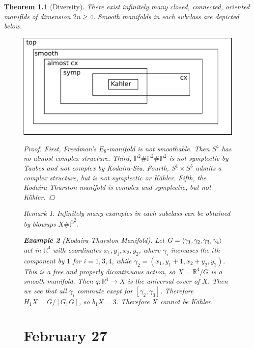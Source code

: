 \documentclass[leqno, openany]{memoir}
\DeclarePairedDelimiter{\gen}{\langle}{\rangle}
\newtheorem{thm}{Theorem}[chapter]
\theoremstyle{definition}
\newtheorem{exm}[thm]{Example}
\theoremstyle{remark}
\newtheorem{rmk}[thm]{Remark}
\theoremstyle{plain}
\theoremstyle{definition}
\theoremstyle{remark}
\newcommand{\R}{\mathbb{R}}
\renewcommand{\P}{\mathbb{P}}
\begin{document}
\begin{thm}[Diversity] There exist infinitely many closed, connected, oriented
    maniflds of dimension $2n \geq 4$. Smooth manifolds in each subclass are
    depicted below.  \begin{figure}[H] \centering
        \includegraphics[width=0.8\linewidth]{mflds} \caption{Classes of
        manifolds.}%

\begin{proof} First, Freedman's $E_8$-manifold is not smoothable. Then $S^4$
    has no almost complex structure. Third, $\P^2 \# \P^2 \# \P^2$ is not
    symplectic by Taubes and not complex by Kodaira-Siu. Fourth, $S^1 \times
    S^3$ admits a complex structure, but is not symplectic or K\"ahler. Fifth,
    the Kodaira-Thurston manifold is complex and symplectic, but not K\"ahler.
\end{proof}

\begin{rmk} Infinitely many examples in each subclass can be obtained by
blowups $X \# \overline{\P}^2$.  \end{rmk}

\begin{exm}[Kodaira-Thurston Manifold] Let $G = \gen{\gamma_1, \gamma_2,
    \gamma_3, \gamma_4}$ act in $\R^4$ with coordinates $x_1, y_1, x_2, y_2$,
    where $\gamma_i$ increases the $i$th component by $1$ for $i = 1,3,4$,
    while $\gamma_2 = (x_1, y_1 + 1, x_2 + y_2, y_2)$. This is a free and
    properly dicontinuous action, so $X = \R^4 / G$ is a smooth manifold. Then
    $q: \R^4 \to X$ is the universal cover of $X$. Then we see that all
    $\gamma_i$ commute exept for $[\gamma_2, \gamma_3]$. Therefore $H_1 X = G/
    [G,G]$, so $b_1 X = 3$. Therefore $X$ cannot be K\"ahler.  \end{exm}

\chapter{February 27}%


\end{figure}
\end{thm}
\end{document}

